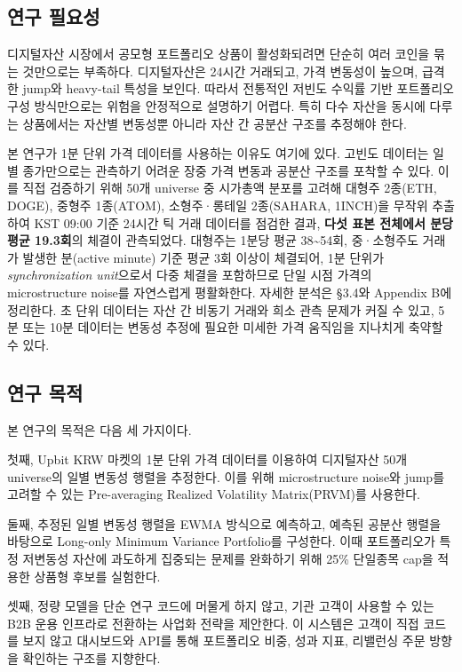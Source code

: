 \documentclass[12pt,a4paper]{article}
\begin{document}
\subsection{연구 필요성}

디지털자산 시장에서 공모형 포트폴리오 상품이 활성화되려면 단순히 여러 코인을 묶는 것만으로는 부족하다. 디지털자산은 24시간 거래되고, 가격 변동성이 높으며, 급격한 jump와 heavy-tail 특성을 보인다. 따라서 전통적인 저빈도 수익률 기반 포트폴리오 구성 방식만으로는 위험을 안정적으로 설명하기 어렵다. 특히 다수 자산을 동시에 다루는 상품에서는 자산별 변동성뿐 아니라 자산 간 공분산 구조를 추정해야 한다.

본 연구가 1분 단위 가격 데이터를 사용하는 이유도 여기에 있다. 고빈도 데이터는 일별 종가만으로는 관측하기 어려운 장중 가격 변동과 공분산 구조를 포착할 수 있다. 이를 직접 검증하기 위해 50개 universe 중 시가총액 분포를 고려해 대형주 2종(ETH, DOGE), 중형주 1종(ATOM), 소형주·롱테일 2종(SAHARA, 1INCH)을 무작위 추출하여 KST 09:00 기준 24시간 틱 거래 데이터를 점검한 결과, \textbf{다섯 표본 전체에서 분당 평균 19.3회}의 체결이 관측되었다. 대형주는 1분당 평균 38\textasciitilde{}54회, 중·소형주도 거래가 발생한 분(active minute) 기준 평균 3회 이상이 체결되어, 1분 단위가 \emph{synchronization unit}으로서 다중 체결을 포함하므로 단일 시점 가격의 microstructure noise를 자연스럽게 평활화한다. 자세한 분석은 \S{}3.4와 Appendix B에 정리한다. 초 단위 데이터는 자산 간 비동기 거래와 희소 관측 문제가 커질 수 있고, 5분 또는 10분 데이터는 변동성 추정에 필요한 미세한 가격 움직임을 지나치게 축약할 수 있다.

\subsection{연구 목적}

본 연구의 목적은 다음 세 가지이다.

첫째, Upbit KRW 마켓의 1분 단위 가격 데이터를 이용하여 디지털자산 50개 universe의 일별 변동성 행렬을 추정한다. 이를 위해 microstructure noise와 jump를 고려할 수 있는 Pre-averaging Realized Volatility Matrix(PRVM)를 사용한다.

둘째, 추정된 일별 변동성 행렬을 EWMA 방식으로 예측하고, 예측된 공분산 행렬을 바탕으로 Long-only Minimum Variance Portfolio를 구성한다. 이때 포트폴리오가 특정 저변동성 자산에 과도하게 집중되는 문제를 완화하기 위해 25\% 단일종목 cap을 적용한 상품형 후보를 실험한다.

셋째, 정량 모델을 단순 연구 코드에 머물게 하지 않고, 기관 고객이 사용할 수 있는 B2B 운용 인프라로 전환하는 사업화 전략을 제안한다. 이 시스템은 고객이 직접 코드를 보지 않고 대시보드와 API를 통해 포트폴리오 비중, 성과 지표, 리밸런싱 주문 방향을 확인하는 구조를 지향한다.
\end{document}

